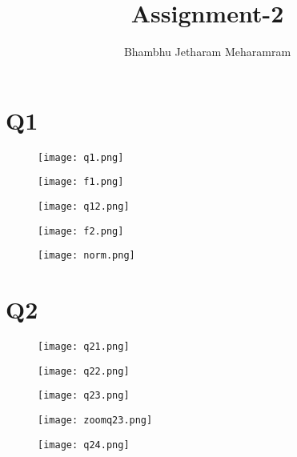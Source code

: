 \documentclass[12pt]{article}
\begin{document}
\author{Bhambhu Jetharam Meharamram}
\title{Assignment-2}
\date{}

\maketitle
\section{Q1}

\begin{figure}[H]
    \centering
    \texttt{[image: q1.png]}
\end{figure}
\begin{figure}[H]
    \centering
    \texttt{[image: f1.png]}
\end{figure}

\begin{figure}[H]
    \centering
    \texttt{[image: q12.png]}
\end{figure}
\begin{figure}[H]
    \centering
    \texttt{[image: f2.png]}
\end{figure}
\begin{figure}[H]
    \centering
    \texttt{[image: norm.png]}
\end{figure}


\section{Q2}

\begin{figure}[H]
    \centering
    \texttt{[image: q21.png]}
\end{figure}

\begin{figure}[H]
    \centering
    \texttt{[image: q22.png]}
\end{figure}

\begin{figure}[H]
    \centering
    \texttt{[image: q23.png]}
\end{figure}

\begin{figure}[H]
    \centering
    \texttt{[image: zoomq23.png]}
\end{figure}

\begin{figure}[H]
    \centering
    \texttt{[image: q24.png]}
\end{figure}
\end{document}
